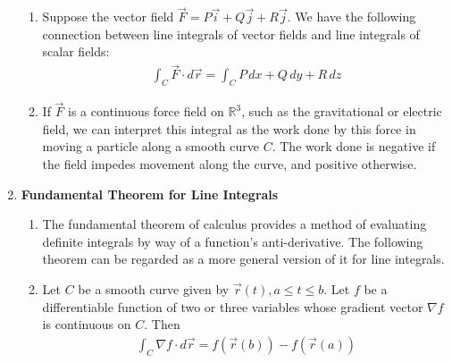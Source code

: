 \documentclass[10pt]{article}
\begin{document}
\begin{multicols}{2}
\begin{enumerate}
\begin{enumerate}
        \item Suppose the vector field $\vec{F}=P\vec{i}+Q\vec{j}+R\vec{j}$. We have the following connection between line integrals of vector fields and line integrals of scalar fields:
        \begin{align*}
            \int_C \vec{F} \cdot d\vec{r} = \int_C P \,dx + Q \,dy + R \,dz
        \end{align*}
        \item If $\vec{F}$ is a continuous force field on $\mathbb{R}^3$, such as the gravitational or electric field, we can interpret this integral as the work done by this force in moving a particle along a smooth curve $C$. The work done is negative if the field impedes movement along the curve, and positive otherwise.
    \end{enumerate}
    
    \item \textbf{Fundamental Theorem for Line Integrals}
    \begin{enumerate}
        \item The fundamental theorem of calculus provides a method of evaluating definite integrals by way of a function's anti-derivative. The following theorem can be regarded as a more general version of it for line integrals.
        \item Let $C$ be a smooth curve given by $\vec{r}(t), a \leq t \leq b$. Let $f$ be a differentiable function of two or three variables whose gradient vector $\nabla f$ is continuous on $C$. Then
        \begin{align*}
            \int_C \nabla f \cdot d\vec{r} = f(\vec{r}(b)) - f(\vec{r}(a))
        \end{align*}


\end{enumerate}
\end{enumerate}
\end{multicols}
\end{document}
